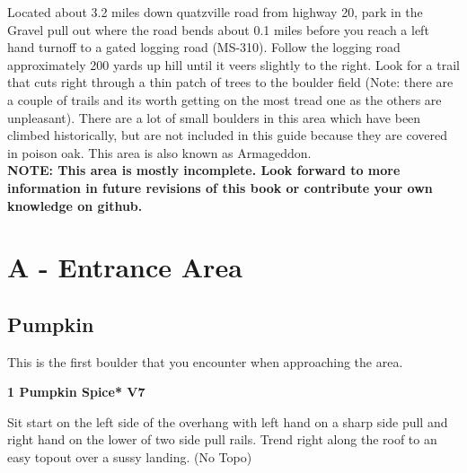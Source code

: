 

\raggedcolumns
\begin{multicols}{2}

Located about 3.2 miles down quatzville road from highway 20, park in the Gravel pull out where the road bends about 0.1 miles before you reach a left hand turnoff to a gated logging road (MS-310). Follow the logging road approximately 200 yards up hill until it veers slightly to the right. Look for a trail that cuts right through a thin patch of trees to the boulder field (Note: there are a couple of trails and its worth getting on the most tread one as the others are unpleasant). There are a lot of small boulders in this area which have been climbed historically, but are not included in this guide because they are covered in poison oak. This area is also known as Armageddon.\\

\textbf{NOTE: This area is mostly incomplete. Look forward to more information in future revisions of this book or contribute your own knowledge on github.}\\

\newpage

		\section{A - Entrance Area}\label{sa:Entrance Area}
	
	
			\subsection*{Pumpkin}\label{bf:Pumpkin}
			This is the first boulder that you encounter when approaching the area.\\
			
					\label{rt:Pumpkin Spice}
\colorbox{Goldenrod!50}{
\parbox{0.95\linewidth}{
\textbf{
1 Pumpkin Spice* V7  
}
}
}

					\begin{adjustwidth}{0.5cm}{}				
					Sit start on the left side of the overhang with left hand on a sharp side pull and right hand on the lower of two side pull rails. Trend right along the roof to an easy topout over a sussy landing.
						\newline (No Topo) 
					\end{adjustwidth}

\end{multicols}
